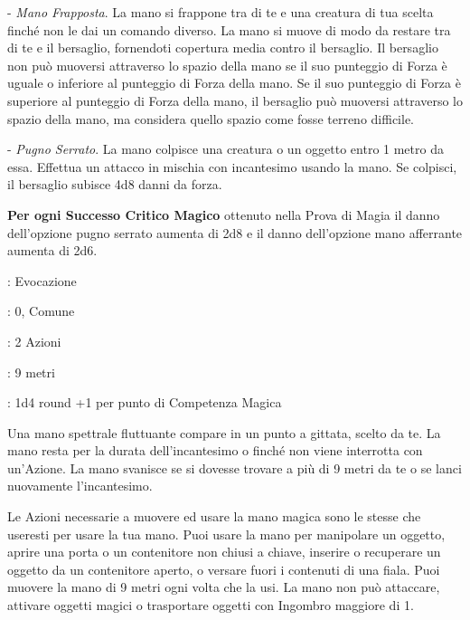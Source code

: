 \begin{multicols}{2}
- \emph{Mano Frapposta}. La mano si frappone tra di te e una creatura di tua scelta finché non le dai un comando diverso. La mano si muove di modo da restare tra di te e il bersaglio, fornendoti copertura media contro il bersaglio. Il bersaglio non può muoversi attraverso lo spazio della mano se il suo punteggio di Forza è uguale o inferiore al punteggio di Forza della mano. Se il suo punteggio di Forza è superiore al punteggio di Forza della mano, il bersaglio può muoversi attraverso lo spazio della mano, ma considera quello spazio come fosse terreno difficile.

- \emph{Pugno Serrato}. La mano colpisce una creatura o un oggetto entro 1 metro da essa. Effettua un attacco in mischia con incantesimo usando la mano. Se colpisci, il bersaglio subisce 4d8 danni da forza.

\textbf{Per ogni Successo Critico Magico} ottenuto nella Prova di Magia il danno dell'opzione pugno serrato aumenta di 2d8 e il danno dell'opzione mano afferrante aumenta di 2d6.

\noindent\colorbox{OBSSgold!10}{
\begin{minipage}{0.95\linewidth}
\begin{description}[noitemsep, topsep=0pt, parsep=0pt, partopsep=0pt, leftmargin=0cm, labelwidth=1.3cm]
	\item[\textbf{Lista}]: Evocazione
	\item[\textbf{Livello}]: 0, Comune
	\item[\textbf{Lancio}]: 2 Azioni
	\item[\textbf{Gittata}]: 9 metri
	\item[\textbf{Durata}]: 1d4 round +1 per punto di Competenza Magica
\end{description}
\end{minipage}}\smallskip

Una mano spettrale fluttuante compare in un punto a gittata, scelto da te. La mano resta per la durata dell'incantesimo o finché non viene interrotta con un'Azione. La mano svanisce se si dovesse trovare a più di 9 metri da te o se lanci nuovamente l'incantesimo.

Le Azioni necessarie a muovere ed usare la mano magica sono le stesse che useresti per usare la tua mano. Puoi usare la mano per manipolare un oggetto, aprire una porta o un contenitore non chiusi a chiave, inserire o recuperare un oggetto da un contenitore aperto, o versare fuori i contenuti di una fiala. Puoi muovere la mano di 9 metri ogni volta che la usi. La mano non può attaccare, attivare oggetti magici o trasportare oggetti con Ingombro maggiore di 1.


\end{multicols}
